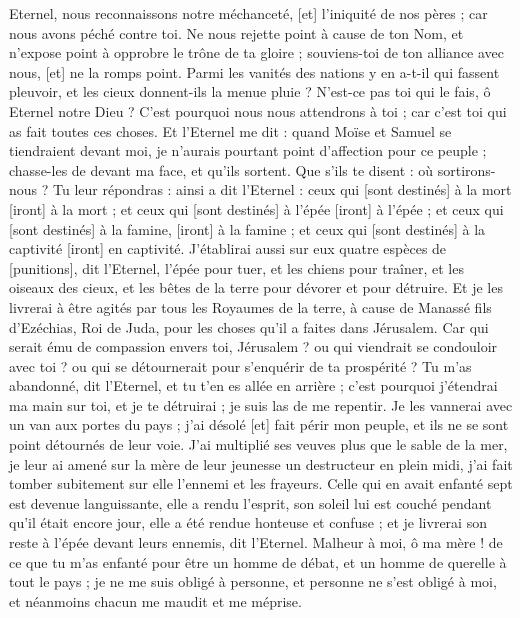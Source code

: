 \begin{multicols}{2}
Eternel, nous reconnaissons notre méchanceté, [et] l'iniquité de nos pères ; car nous avons péché contre toi.
Ne nous rejette point à cause de ton Nom, et n'expose point à opprobre le trône de ta gloire ; souviens-toi de ton alliance avec nous, [et] ne la romps point.
Parmi les vanités des nations y en a-t-il qui fassent pleuvoir, et les cieux donnent-ils la menue pluie ? N'est-ce pas toi qui le fais, ô Eternel notre Dieu ? C'est pourquoi nous nous attendrons à toi ; car c'est toi qui as fait toutes ces choses.
\VerseOne{}Et l'Eternel me dit : quand Moïse et Samuel se tiendraient devant moi, je n'aurais pourtant point d'affection pour ce peuple ; chasse-les de devant ma face, et qu'ils sortent.
Que s'ils te disent : où sortirons-nous ? Tu leur répondras : ainsi a dit l'Eternel : ceux qui [sont destinés] à la mort [iront] à la mort ; et ceux qui [sont destinés] à l’épée [iront] à l’épée ; et ceux qui [sont destinés] à la famine, [iront] à la famine ; et ceux qui [sont destinés] à la captivité [iront] en captivité.
J'établirai aussi sur eux quatre espèces de [punitions], dit l'Eternel, l'épée pour tuer, et les chiens pour traîner, et les oiseaux des cieux, et les bêtes de la terre pour dévorer et pour détruire.
Et je les livrerai à être agités par tous les Royaumes de la terre, à cause de Manassé fils d'Ezéchias, Roi de Juda, pour les choses qu'il a faites dans Jérusalem.
Car qui serait ému de compassion envers toi, Jérusalem ? ou qui viendrait se condouloir avec toi ? ou qui se détournerait pour s'enquérir de ta prospérité ?
Tu m'as abandonné, dit l'Eternel, et tu t'en es allée en arrière ; c'est pourquoi j'étendrai ma main sur toi, et je te détruirai ; je suis las de me repentir.
Je les vannerai avec un van aux portes du pays ; j'ai désolé [et] fait périr mon peuple, et ils ne se sont point détournés de leur voie.
J'ai multiplié ses veuves plus que le sable de la mer, je leur ai amené sur la mère de leur jeunesse un destructeur en plein midi, j'ai fait tomber subitement sur elle l'ennemi et les frayeurs.
Celle qui en avait enfanté sept est devenue languissante, elle a rendu l'esprit, son soleil lui est couché pendant qu'il était encore jour, elle a été rendue honteuse et confuse ; et je livrerai son reste à l'épée devant leurs ennemis, dit l'Eternel.
Malheur à moi, ô ma mère ! de ce que tu m'as enfanté pour être un homme de débat, et un homme de querelle à tout le pays ; je ne me suis obligé à personne, et personne ne s'est obligé à moi, et néanmoins chacun me maudit et me méprise.

\end{multicols}
